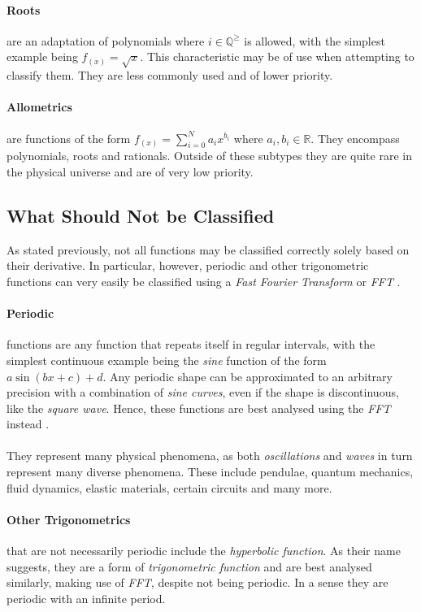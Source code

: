 \documentclass[main.tex]{subfiles}
\begin{document}
      \paragraph{Roots} are an adaptation of polynomials where $i \in \mathbb{Q}^\geq$ is allowed, with the simplest example being $f_{(x)}=\sqrt{x}$. This characteristic may be of use when attempting to classify them. They are less commonly used and of lower priority.
      \paragraph{Allometrics} are functions of the form $f_{(x)}=\sum_{i=0}^{N} a_i x^{b_i} $ where $a_i,b_i \in \mathbb{R}$. They encompass polynomials, roots and rationals. Outside of these subtypes they are quite rare in the physical universe and are of very low priority.
    
    \subsection{What Should Not be Classified}
      
      As stated previously, not all functions may be classified correctly solely based on their derivative. In particular, however, periodic and other trigonometric functions can very easily be classified using a \textit{Fast Fourier Transform} or \textit{FFT} \cite{}.
      \paragraph{Periodic} functions are any function that repeats itself in regular intervals, with the simplest continuous example being the \textit{sine} function of the form $a \sin(b x + c) + d$. Any periodic shape can be approximated to an arbitrary precision with a combination of \textit{sine curves}, even if the shape is discontinuous, like the \textit{square wave}. Hence, these functions are best analysed using the \textit{FFT} instead \cite{}.
      \\\\
      They represent many physical phenomena, as both \textit{oscillations} and \textit{waves} in turn represent many diverse phenomena. These include pendulae, quantum mechanics, fluid dynamics, elastic materials, certain circuits and many more.
      \paragraph{Other Trigonometrics} that are not necessarily periodic include the \textit{hyperbolic function}. As their name suggests, they are a form of \textit{trigonometric function} and are best analysed similarly, making use of \textit{FFT}, despite not being periodic. In a sense they are periodic with an infinite period. 
      
\end{document}
